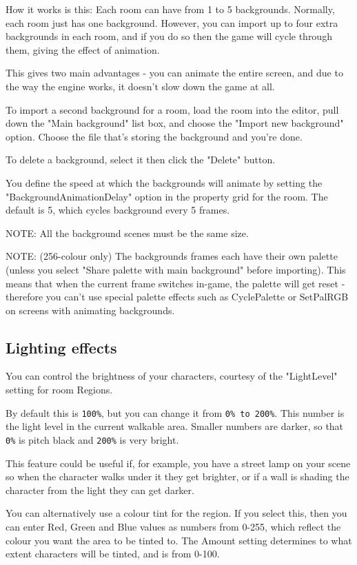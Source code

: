 How it works is this: Each room can have from 1 to 5 backgrounds. Normally,
each room just has one background. However, you can import up to four extra
backgrounds in each room, and if you do so then the game will cycle through
them, giving the effect of animation.

This gives two main advantages - you can animate the entire screen, and due
to the way the engine works, it doesn't slow down the game at all.

To import a second background for a room, load the room into the editor, pull
down the "Main background" list box, and choose the "Import new background" option.
Choose the file that's storing the background and you're done.

To delete a background, select it then click the "Delete" button.

You define the speed at which the backgrounds will animate by setting the
"BackgroundAnimationDelay" option in the property grid for the room. The default
is 5, which cycles background every 5 frames.

\it{NOTE: All the background scenes must be the same size.

NOTE: (256-colour only) The backgrounds frames each have their own palette (unless
you select "Share palette with main background" before importing). This means
that when the current frame switches in-game, the palette will get reset - therefore
you can't use special palette effects such as CyclePalette or SetPalRGB on screens
with animating backgrounds.}


\subsection{Lighting effects}%

You can control the brightness of your characters, courtesy of the "LightLevel" setting
for room Regions.

By default this is \verb$100%$, but you can change it from \verb$0% to 200%$.
This number is the light level in the current walkable area. Smaller
numbers are darker, so that \verb$0%$ is pitch black and \verb$200%$ is very bright.

This feature could be useful if, for example, you have a street lamp on your scene so
when the character walks under it they get brighter, or if a wall is shading
the character from the light they can get darker.

You can alternatively use a colour tint for the region. If you select this, then you
can enter Red, Green and Blue values as numbers from 0-255, which reflect the colour
you want the area to be tinted to. The Amount setting determines to what extent
characters will be tinted, and is from 0-100.


